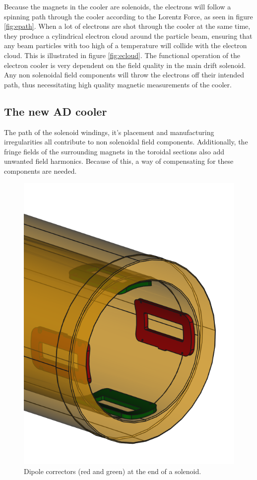 Because the magnets in the cooler are solenoids, the electrons will follow a
spinning path through the cooler according to the Lorentz Force, as seen in 
figure \ref{fig:epath}. When a lot of electrons are shot through the cooler at
the same time, they produce a cylindrical electron cloud around the particle
beam, ensuring that any beam particles with too high of a temperature will
collide with the electron cloud. \cite{Tranquille2018-fs}
This is illustrated in figure \ref{fig:ecloud}. The functional operation
of the electron cooler is very dependent on the field quality in the 
main drift solenoid. Any non solenoidal field components will throw 
the electrons off their intended path, thus necessitating high quality
magnetic measurements of the cooler.
\subsection{The new AD cooler}
The path of the solenoid windings, it's placement and manufacturing
irregularities all contribute to non solenoidal field components.
Additionally, the fringe fields of the surrounding magnets in the 
toroidal sections also add unwanted field harmonics. Because of this,
a way of compensating for these components are needed. 

\newpage
\begin{figure}
    \includegraphics[width=0.9\linewidth]{figs/dipolecorrectors}
    \caption{Dipole correctors (red and green) at the end of a
    solenoid.}
    \label{fig:dipolecorrectors}
\end{figure}

